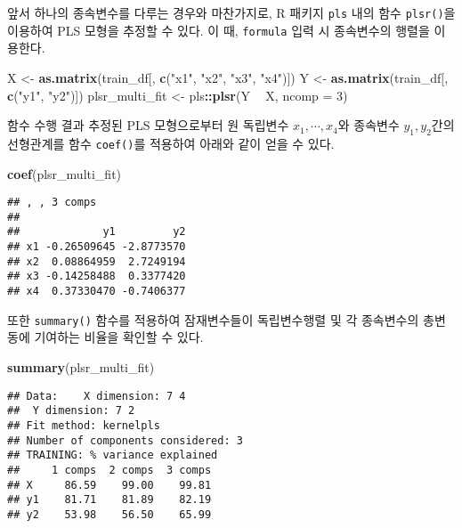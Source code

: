 \documentclass[]{book}
\newenvironment{Shaded}{\begin{snugshade}}{\end{snugshade}}
\newcommand{\DataTypeTok}[1]{\textcolor[rgb]{0.13,0.29,0.53}{#1}}
\newcommand{\DecValTok}[1]{\textcolor[rgb]{0.00,0.00,0.81}{#1}}
\newcommand{\KeywordTok}[1]{\textcolor[rgb]{0.13,0.29,0.53}{\textbf{#1}}}
\newcommand{\NormalTok}[1]{#1}
\newcommand{\OperatorTok}[1]{\textcolor[rgb]{0.81,0.36,0.00}{\textbf{#1}}}
\newcommand{\StringTok}[1]{\textcolor[rgb]{0.31,0.60,0.02}{#1}}
\begin{document}
앞서 하나의 종속변수를 다루는 경우와 마찬가지로, R 패키지 \texttt{pls} 내의 함수 \texttt{plsr()}을 이용하여 PLS 모형을 추정할 수 있다. 이 때, \texttt{formula} 입력 시 종속변수의 행렬을 이용한다.

\begin{Shaded}
\begin{Highlighting}[]
\NormalTok{X <-}\StringTok{ }\KeywordTok{as.matrix}\NormalTok{(train_df[, }\KeywordTok{c}\NormalTok{(}\StringTok{"x1"}\NormalTok{, }\StringTok{"x2"}\NormalTok{, }\StringTok{"x3"}\NormalTok{, }\StringTok{"x4"}\NormalTok{)])}
\NormalTok{Y <-}\StringTok{ }\KeywordTok{as.matrix}\NormalTok{(train_df[, }\KeywordTok{c}\NormalTok{(}\StringTok{"y1"}\NormalTok{, }\StringTok{"y2"}\NormalTok{)])}
\NormalTok{plsr_multi_fit <-}\StringTok{ }\NormalTok{pls}\OperatorTok{::}\KeywordTok{plsr}\NormalTok{(Y }\OperatorTok{~}\StringTok{ }\NormalTok{X, }\DataTypeTok{ncomp =} \DecValTok{3}\NormalTok{)}
\end{Highlighting}
\end{Shaded}

함수 수행 결과 추정된 PLS 모형으로부터 원 독립변수 \(x_1, \cdots, x_4\)와 종속변수 \(y_1, y_2\)간의 선형관계를 함수 \texttt{coef()}를 적용하여 아래와 같이 얻을 수 있다.

\begin{Shaded}
\begin{Highlighting}[]
\KeywordTok{coef}\NormalTok{(plsr_multi_fit)}
\end{Highlighting}
\end{Shaded}

\begin{verbatim}
## , , 3 comps
## 
##             y1         y2
## x1 -0.26509645 -2.8773570
## x2  0.08864959  2.7249194
## x3 -0.14258488  0.3377420
## x4  0.37330470 -0.7406377
\end{verbatim}

또한 \texttt{summary()} 함수를 적용하여 잠재변수들이 독립변수행렬 및 각 종속변수의 총변동에 기여하는 비율을 확인할 수 있다.

\begin{Shaded}
\begin{Highlighting}[]
\KeywordTok{summary}\NormalTok{(plsr_multi_fit)}
\end{Highlighting}
\end{Shaded}

\begin{verbatim}
## Data:    X dimension: 7 4 
##  Y dimension: 7 2
## Fit method: kernelpls
## Number of components considered: 3
## TRAINING: % variance explained
##     1 comps  2 comps  3 comps
## X     86.59    99.00    99.81
## y1    81.71    81.89    82.19
## y2    53.98    56.50    65.99
\end{verbatim}
\end{document}
